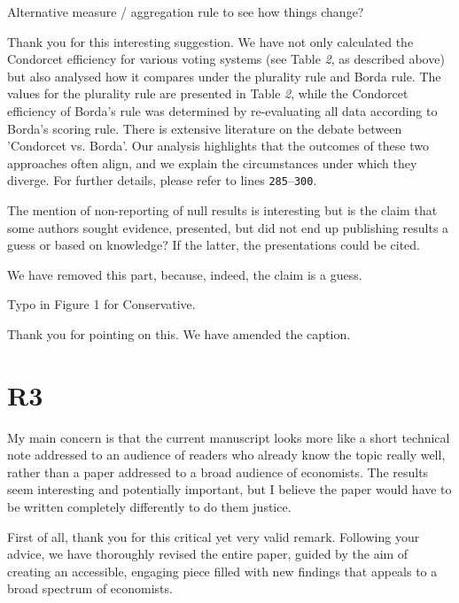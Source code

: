 \documentclass[a4paper, 12pt]{scrartcl}
\theoremstyle{break}
\newenvironment{changes}{\par\color{violet}\par\addvspace{\baselineskip}}{\par\addvspace{\baselineskip}}
\begin{document}
\begin{changes}
Alternative measure / aggregation rule to see how things change?
\end{changes}

Thank you for this interesting suggestion. We have not only calculated the Condorcet efficiency for various voting systems (see Table \textit{2}, as described above) but also analysed how it compares under the plurality rule and Borda rule. The values for the plurality rule are presented in Table \textit{2}, while the Condorcet efficiency of  Borda's rule was determined by re-evaluating all data according to Borda's scoring rule. There is extensive literature on the debate between 'Condorcet vs. Borda'. Our analysis highlights that the outcomes of these two approaches often align, and we explain the circumstances under which they diverge. For further details, please refer to lines \texttt{285$–$300}. 

\begin{changes}
The mention of non-reporting of null results is interesting but is the claim that some authors sought evidence, presented, but did not end up publishing results a guess or based on knowledge? If the latter, the presentations could be cited.
\end{changes}

We have removed this part, because, indeed, the claim is a guess.

\begin{changes}
Typo in Figure 1 for Conservative.
\end{changes}
Thank you for pointing on this. We have amended the caption. 

\newpage
\section*{R3}
\begin{changes}
My main concern is that the current manuscript looks more like a short technical note addressed to an audience of readers who already know the topic really well, rather than a paper addressed to a broad audience of economists. The results seem interesting and potentially important, but I believe the paper would have to be written completely differently to do them justice.
\end{changes}

First of all, thank you for this critical yet very valid remark. Following your advice, we have thoroughly revised the entire paper, guided by the aim of creating an accessible, engaging piece filled with new findings that appeals to a broad spectrum of economists.
\end{document}
